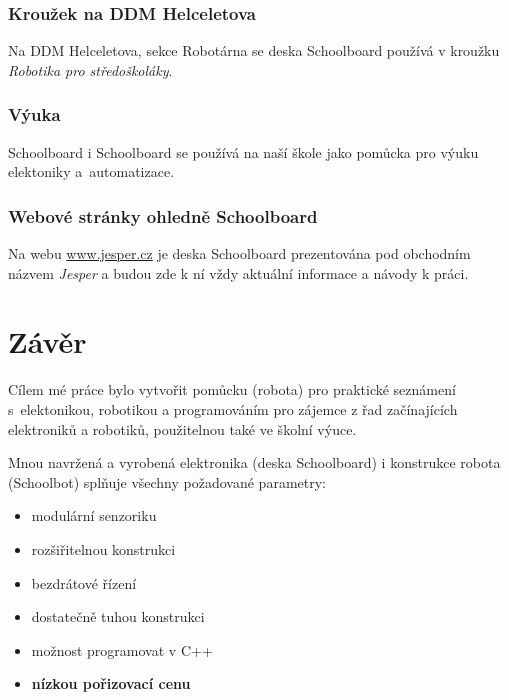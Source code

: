 \documentclass{template/socthesis}
\begin{document}
\subsection{Kroužek na DDM Helceletova}

Na DDM Helceletova, sekce Robotárna se deska Schoolboard používá v kroužku \textit{Robotika pro středoškoláky}.

\subsection{Výuka}

Schoolboard i Schoolboard se používá na naší škole jako pomůcka pro výuku elektoniky  a~automatizace.

\subsection{Webové stránky ohledně Schoolboard}

Na webu \url{www.jesper.cz} je deska Schoolboard prezentována pod obchodním názvem \textit{Jesper} a budou zde k ní vždy aktuální informace a návody k práci.


\chapter*{Závěr} 

Cílem mé práce bylo  vytvořit pomůcku (robota) pro praktické seznámení s~elektonikou, robotikou a programováním pro zájemce z řad začínajících elektroniků a robotiků, použitelnou také  ve  školní výuce.   

Mnou navržená a vyrobená elektronika (deska Schoolboard) i konstrukce robota (Schoolbot) splňuje všechny požadované parametry: 
 

\begin{itemize}
	\item modulární senzoriku
	
	\item rozšiřitelnou konstrukci
	
	\item bezdrátové řízení
	
	\item dostatečně tuhou konstrukci
	
	\item  možnost programovat v C++
	
	\item \textbf{nízkou pořizovací cenu}
\end{itemize}
\end{document}
